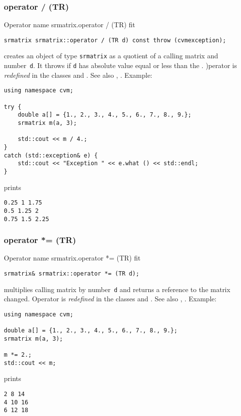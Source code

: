 \subsubsection{operator / (TR)}
Operator%
\pdfdest name {srmatrix.operator / (TR)} fit
\begin{verbatim}
srmatrix srmatrix::operator / (TR d) const throw (cvmexception);
\end{verbatim}
creates an object of type \verb"srmatrix" as a quotient of
a calling matrix and  number~\verb"d". It throws
if \verb"d" has  absolute value equal or less than the
.
)perator is \emph{redefined} in the classes
and .
See also ,
.
Example:
\begin{Verbatim}
using namespace cvm;

try {
    double a[] = {1., 2., 3., 4., 5., 6., 7., 8., 9.};
    srmatrix m(a, 3);

    std::cout << m / 4.;
}
catch (std::exception& e) {
    std::cout << "Exception " << e.what () << std::endl;
}
\end{Verbatim}
prints
\begin{Verbatim}
0.25 1 1.75
0.5 1.25 2
0.75 1.5 2.25
\end{Verbatim}
\newpage



\subsubsection{operator *= (TR)}
Operator%
\pdfdest name {srmatrix.operator *= (TR)} fit
\begin{verbatim}
srmatrix& srmatrix::operator *= (TR d);
\end{verbatim}
multiplies  calling matrix by  number~\verb"d"
and returns a reference to
the matrix changed.
Operator is \emph{redefined} in the classes
and .
See also ,
.
Example:
\begin{Verbatim}
using namespace cvm;

double a[] = {1., 2., 3., 4., 5., 6., 7., 8., 9.};
srmatrix m(a, 3);

m *= 2.;
std::cout << m;
\end{Verbatim}
prints
\begin{Verbatim}
2 8 14
4 10 16
6 12 18
\end{Verbatim}
\newpage



